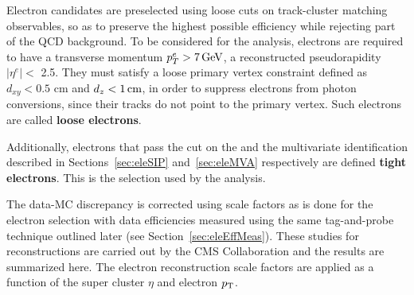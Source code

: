 Electron candidates are preselected using loose cuts on track-cluster matching observables, so as to preserve the highest possible efficiency while rejecting part of the QCD background. To be considered for the analysis, electrons are required to have a
transverse momentum $p^e_T > 7 \,\text{Ge\hspace{-.08em}V}$,
a reconstructed pseudorapidity $|\eta^e| <$ 2.5.
They must satisfy a loose primary vertex
constraint defined as $d_{xy} < 0.5$ cm and $d_z < 1\,\text{cm}$,
in order to suppress electrons from photon conversions, since their tracks do not point to the primary vertex.
Such electrons are called {\bf loose electrons}.

Additionally,
electrons that pass the cut on the \SIPthreeD and the multivariate identification described in
Sections~\ref{sec:eleSIP} and~\ref{sec:eleMVA} respectively
are defined {\bf tight electrons}.
This is the selection used by the analysis.

The data-MC discrepancy is corrected using scale factors as is done for the electron selection with data efficiencies measured using the same tag-and-probe technique outlined later (see Section~\ref{sec:eleEffMeas}).
These studies for reconstructions are carried out by the CMS Collaboration and the results are summarized here.
The electron reconstruction scale factors
are applied as a function of the super cluster $\eta$ and electron $p_{\mathrm{T}}$.
